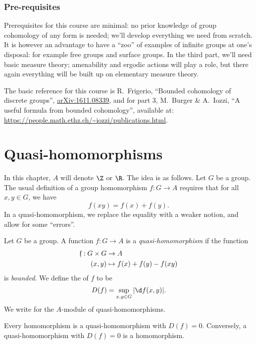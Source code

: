 \documentclass[a4paper]{article}
\newcommand\QH{\mathcal{QH}}
\begin{document}
{\subsubsection*{Pre-requisites}
Prerequisites for this course are minimal: no prior knowledge of group cohomology of any form is needed; we'll develop everything we need from scratch. It is however an advantage to have a ``zoo'' of examples of infinite groups at one's disposal: for example free groups and surface groups. In the third part, we'll need basic measure theory; amenability and ergodic actions will play a role, but there again everything will be built up on elementary measure theory.

The basic reference for this course is R.\ Frigerio, ``Bounded cohomology of discrete groups'', \href{https://arxiv.org/abs/1611.08339}{arXiv:1611.08339}, and for part 3, M.\ Burger \& A.\ Iozzi, ``A useful formula from bounded cohomology'', available at: \url{https://people.math.ethz.ch/~iozzi/publications.html}.%
}
\tableofcontents

\section{Quasi-homomorphisms}
In this chapter, $A$ will denote $\Z$ or $\R$. The idea is as follows. Let $G$ be a group. The usual definition of a group homomorphism $f: G \to A$ requires that for all $x, y \in G$, we have
\[
  f(xy) = f(x) + f(y).
\]
In a quasi-homomorphism, we replace the equality with a weaker notion, and allow for some ``errors''.

\begin{defi}
  Let $G$ be a group. A function $f: G \to A$ is a \emph{quasi-homomorphism} if the function
  \begin{align*}
    \d f: G \times G &\to A\\
    (x, y) &\mapsto f(x) + f(y) - f(xy)
  \end{align*}
  is \emph{bounded}. We define the  of $f$ to be
  \[
    D(f) = \sup_{x, y \in G} |\d f(x, y)|.
  \]
  We write \term{$\QH(G, A)$} for the $A$-module of quasi-homomorphisms.
\end{defi}

\begin{eg}
  Every homomorphism is a quasi-homomorphism with $D(f) = 0$. Conversely, a quasi-homomorphism with $D(f) = 0$ is a homomorphism.
\end{eg}
\end{document}
